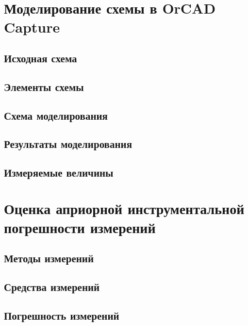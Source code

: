 





\section{Моделирование схемы в OrCAD Capture}

\subsection{Исходная схема}

\subsection{Элементы схемы}

\subsection{Схема моделирования}

\subsection{Результаты моделирования}

\subsection{Измеряемые величины}

\section{Оценка априорной инструментальной погрешности измерений}

\subsection{Методы измерений}

\subsection{Средства измерений}

\subsection{Погрешность измерений}


